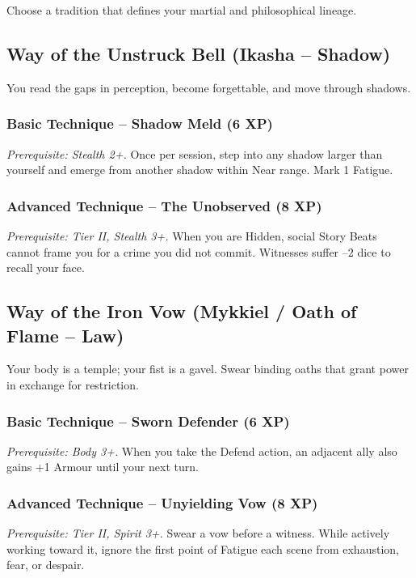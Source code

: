 \documentclass[9pt,a5paper]{extbook}
\begin{document}
Choose a tradition that defines your martial and philosophical lineage.

\subsection{Way of the Unstruck Bell (Ikasha -- Shadow)}

You read the gaps in perception, become forgettable, and move through shadows.

\subsubsection*{Basic Technique -- Shadow Meld (6 XP)}
\textit{Prerequisite: Stealth 2+.} Once per session, step into any shadow larger than yourself and emerge from another shadow within Near range. Mark 1 Fatigue.

\subsubsection*{Advanced Technique -- The Unobserved (8 XP)}
\textit{Prerequisite: Tier II, Stealth 3+.} When you are Hidden, social Story Beats cannot frame you for a crime you did not commit. Witnesses suffer --2 dice to recall your face.

\subsection{Way of the Iron Vow (Mykkiel / Oath of Flame -- Law)}

Your body is a temple; your fist is a gavel. Swear binding oaths that grant power in exchange for restriction.

\subsubsection*{Basic Technique -- Sworn Defender (6 XP)}
\textit{Prerequisite: Body 3+.} When you take the Defend action, an adjacent ally also gains +1 Armour until your next turn.

\subsubsection*{Advanced Technique -- Unyielding Vow (8 XP)}
\textit{Prerequisite: Tier II, Spirit 3+.} Swear a vow before a witness. While actively working toward it, ignore the first point of Fatigue each scene from exhaustion, fear, or despair.
\end{document}
